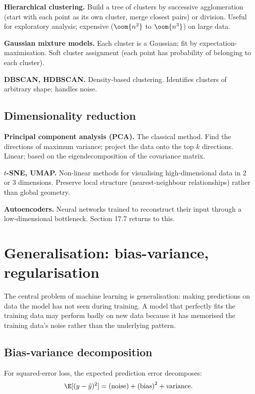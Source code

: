 \textbf{Hierarchical clustering.} Build a tree of clusters by successive agglomeration (start with each point as its own cluster, merge closest pairs) or division. Useful for exploratory analysis; expensive ($\oom{n^2}$ to $\oom{n^3}$) on large data.

\textbf{Gaussian mixture models.} Each cluster is a Gaussian; fit by expectation-maximisation. Soft cluster assignment (each point has probability of belonging to each cluster).

\textbf{DBSCAN, HDBSCAN.} Density-based clustering. Identifies clusters of arbitrary shape; handles noise.

\subsection{Dimensionality reduction}

\textbf{Principal component analysis (PCA).} The classical method. Find the directions of maximum variance; project the data onto the top $k$ directions. Linear; based on the eigendecomposition of the covariance matrix.

\textbf{$t$-SNE, UMAP.} Non-linear methods for visualising high-dimensional data in 2 or 3 dimensions. Preserve local structure (nearest-neighbour relationships) rather than global geometry.

\textbf{Autoencoders.} Neural networks trained to reconstruct their input through a low-dimensional bottleneck. Section 17.7 returns to this.

\section{Generalisation: bias-variance, regularisation}

The central problem of machine learning is generalisation: making predictions on data the model has not seen during training. A model that perfectly fits the training data may perform badly on new data because it has memorised the training data's noise rather than the underlying pattern.

\subsection{Bias-variance decomposition}

For squared-error loss, the expected prediction error decomposes:
\[
\E[(y - \hat{y})^2] = \text{(noise)} + \text{(bias)}^2 + \text{variance}.
\]

